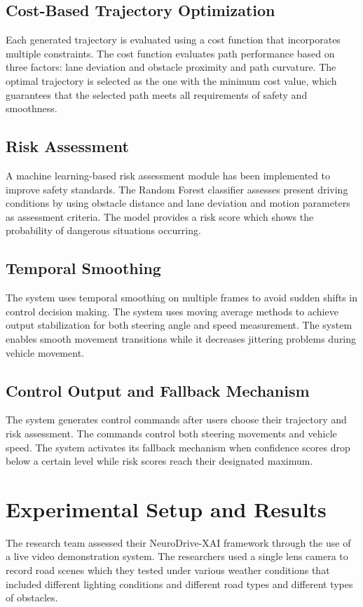 \documentclass[conference]{IEEEtran}
\begin{document}
\subsection{Cost-Based Trajectory Optimization}
Each generated trajectory is evaluated using a cost function that incorporates multiple constraints. The cost function evaluates path performance based on three factors: lane deviation and obstacle proximity and path curvature. The optimal trajectory is selected as the one with the minimum cost value, which guarantees that the selected path meets all requirements of safety and smoothness.

\subsection{Risk Assessment}
A machine learning-based risk assessment module has been implemented to improve safety standards. The Random Forest classifier assesses present driving conditions by using obstacle distance and lane deviation and motion parameters as assessment criteria. The model provides a risk score which shows the probability of dangerous situations occurring.

\subsection{Temporal Smoothing}
The system uses temporal smoothing on multiple frames to avoid sudden shifts in control decision making. The system uses moving average methods to achieve output stabilization for both steering angle and speed measurement. The system enables smooth movement transitions while it decreases jittering problems during vehicle movement.

\subsection{Control Output and Fallback Mechanism}
The system generates control commands after users choose their trajectory and risk assessment. The commands control both steering movements and vehicle speed. The system activates its fallback mechanism when confidence scores drop below a certain level while risk scores reach their designated maximum.

\section{Experimental Setup and Results}
The research team assessed their NeuroDrive-XAI framework through the use of a live video demonstration system. The researchers used a single lens camera to record road scenes which they tested under various weather conditions that included different lighting conditions and different road types and different types of obstacles. 
\end{document}
